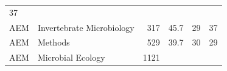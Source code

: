 \documentclass[11pt,]{article}
\begin{document}
\begin{longtable}[]{@{}llrrrr@{}}
\begin{minipage}[t]{0.11\columnwidth}
37\strut
\end{minipage}\tabularnewline
\begin{minipage}[t]{0.06\columnwidth}\raggedright\strut
AEM\strut
\end{minipage} & \begin{minipage}[t]{0.43\columnwidth}\raggedright\strut
Invertebrate Microbiology\strut
\end{minipage} & \begin{minipage}[t]{0.04\columnwidth}\raggedleft\strut
317\strut
\end{minipage} & \begin{minipage}[t]{0.08\columnwidth}\raggedleft\strut
45.7\strut
\end{minipage} & \begin{minipage}[t]{0.11\columnwidth}\raggedleft\strut
29\strut
\end{minipage} & \begin{minipage}[t]{0.11\columnwidth}\raggedleft\strut
37\strut
\end{minipage}\tabularnewline
\begin{minipage}[t]{0.06\columnwidth}\raggedright\strut
AEM\strut
\end{minipage} & \begin{minipage}[t]{0.43\columnwidth}\raggedright\strut
Methods\strut
\end{minipage} & \begin{minipage}[t]{0.04\columnwidth}\raggedleft\strut
529\strut
\end{minipage} & \begin{minipage}[t]{0.08\columnwidth}\raggedleft\strut
39.7\strut
\end{minipage} & \begin{minipage}[t]{0.11\columnwidth}\raggedleft\strut
30\strut
\end{minipage} & \begin{minipage}[t]{0.11\columnwidth}\raggedleft\strut
29\strut
\end{minipage}\tabularnewline
\begin{minipage}[t]{0.06\columnwidth}\raggedright\strut
AEM\strut
\end{minipage} & \begin{minipage}[t]{0.43\columnwidth}\raggedright\strut
Microbial Ecology\strut
\end{minipage} & \begin{minipage}[t]{0.04\columnwidth}\raggedleft\strut
1121\strut
\end{minipage} & \begin{minipage}[t]{0.08\columnwidth}\raggedleft\strut

\end{minipage}
\end{longtable}
\end{document}
